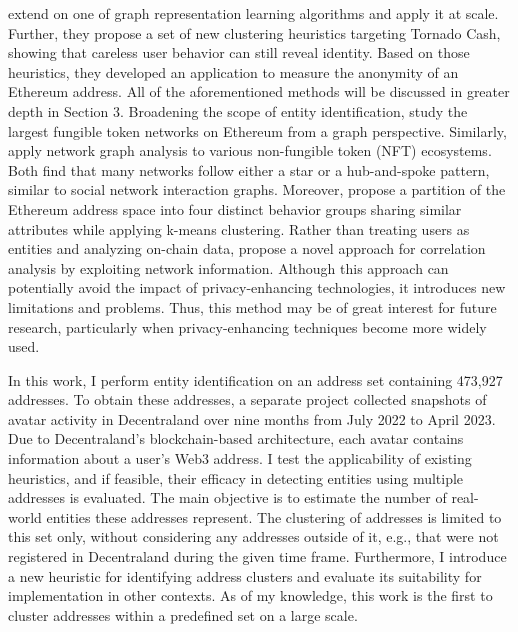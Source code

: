 \documentclass[12pt,a4paper,titlepage,oneside,english]{article}
\begin{document}
\cite{wu2022tutela} extend on one of \cite{Beres2020} graph representation learning algorithms and apply it at scale. Further, they propose a set of new clustering heuristics targeting Tornado Cash,  showing that careless user behavior can still reveal identity. Based on those heuristics, they developed an application to measure the anonymity of an Ethereum address. All of the aforementioned methods will be discussed in greater depth in Section 3. \newline
Broadening the scope of entity identification, \cite{victorlüders2019} study the largest fungible token networks on Ethereum from a graph perspective. Similarly, \cite{casalebrunet2021} apply network graph analysis to various non-fungible token (NFT) ecosystems. Both find that many networks follow either a star or a hub-and-spoke pattern, similar to social network interaction graphs. Moreover, \cite{Payette2017} propose a partition of the Ethereum address space into four distinct behavior groups sharing similar attributes while applying k-means clustering.\newline
Rather than treating users as entities and analyzing on-chain data, \cite{yu2023} propose a novel approach for correlation analysis by exploiting network information. Although this approach can potentially avoid the impact of privacy-enhancing technologies, it introduces new limitations and problems. Thus, this method may be of great interest for future research, particularly when privacy-enhancing techniques become more widely used.

In this work, I perform entity identification on an address set containing 473,927 addresses. To obtain these addresses, a separate project collected snapshots of avatar activity in Decentraland over nine months from July 2022 to April 2023. Due to Decentraland's blockchain-based architecture, each avatar contains information about a user's Web3 address. \newline
I test the applicability of existing heuristics, and if feasible, their efficacy in detecting entities using multiple addresses is evaluated.
The main objective is to estimate the number of real-world entities these addresses represent. The clustering of addresses is limited to this set only, without considering any addresses outside of it, e.g., that were not registered in Decentraland during the given time frame. Furthermore, I introduce a new heuristic for identifying address clusters and evaluate its suitability for implementation in other contexts. As of my knowledge, this work is the first to cluster addresses within a predefined set on a large scale.
\end{document}
